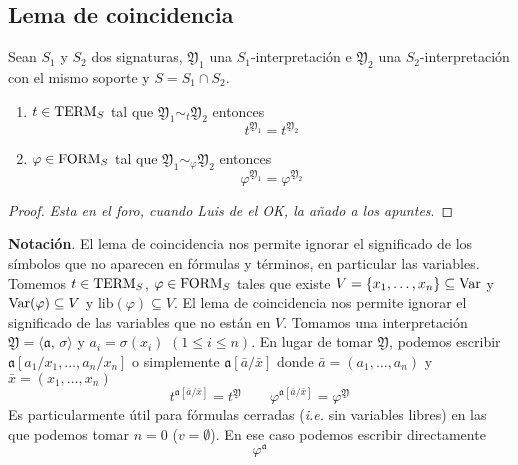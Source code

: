 \subsection{Lema de coincidencia}
\begin{theorem}
Sean $S_1$ y $S_2$ dos signaturas, $\mathfrak{Y}_1$ una $S_1$-interpretación e $\mathfrak{Y}_2$ una $S_2$-interpretación con el mismo soporte y $S=S_1 \cap S_2$. 
\begin{enumerate}
	\item $t \in \mbox{TERM}_{S}$ tal que $\mathfrak{Y}_1 \sim_{t} \mathfrak{Y}_2$ entonces 
	\[ t^{\mathfrak{Y}_1}=t^{\mathfrak{Y}_2} \]
	\item $\varphi \in \mbox{FORM}_{S}$ tal que $\mathfrak{Y}_1 \sim_{\varphi} \mathfrak{Y}_2$ entonces 
	\[ \varphi^{\mathfrak{Y}_1}=\varphi^{\mathfrak{Y}_2} \]
\end{enumerate}
\end{theorem}
\begin{proof}
{\color{blue}\textit{Esta en el foro, cuando Luis de el OK, la añado a los apuntes}.}
\end{proof}

\textbf{Notación}. El lema de coincidencia nos permite ignorar el significado de los símbolos que no aparecen en fórmulas y términos, en particular las variables. Tomemos $t \in \mbox{TERM}_{S}$, $\varphi \in \mbox{FORM}_{S}$ tales que existe $V=\{ x_1, \ldots, x_n \} \subseteq \mbox{Var}$ y $\mbox{Var}(\varphi)\subseteq V$ y $\mbox{lib}(\varphi) \subseteq V$. El lema de coincidencia nos permite ignorar el significado de las variables que no están en $V$. Tomamos una interpretación $\mathfrak{Y}=\langle \mathfrak{a}, \, \sigma \rangle$ y $a_i= \sigma(x_i)$ $(1 \leq i \leq n)$. En lugar de tomar $\mathfrak{Y}$, podemos escribir $\mathfrak{a}[a_1/x_1, \ldots, a_n/x_n]$ o simplemente $\mathfrak{a}[\bar{a}/\bar{x}]$ donde $\bar{a}=(a_1, \ldots, a_n)$ y $\bar{x}=(x_1, \ldots, x_n)$
\[ t^{\mathfrak{a}[\bar{a}/\bar{x}]}=t^{\mathfrak{Y}} \qquad \varphi^{\mathfrak{a}[\bar{a}/\bar{x}]}=\varphi^{\mathfrak{Y}} \]
Es particularmente útil para fórmulas cerradas (\textit{i.e.} sin variables libres) en las que podemos tomar $n=0$ ($v=\emptyset$). En ese caso podemos escribir directamente 
\[ \varphi^{\mathfrak{a}} \]
  